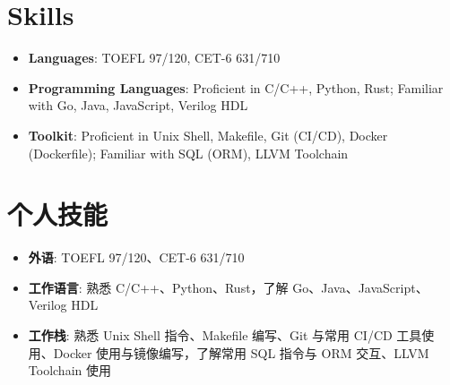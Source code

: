 \ifdefined\english

    \section*{Skills}

    \begin{itemize}
        \item \textbf{Languages}: TOEFL 97/120, CET-6 631/710
        \item \textbf{Programming Languages}: Proficient in C/C++, Python, Rust; Familiar with Go, Java, JavaScript, Verilog HDL
        \item \textbf{Toolkit}: Proficient in Unix Shell, Makefile, Git (CI/CD), Docker (Dockerfile);  Familiar with SQL (ORM), LLVM Toolchain
    \end{itemize}

\else

    \section*{个人技能}

    \begin{itemize}
        \item \textbf{外语}: TOEFL 97/120、CET-6 631/710
        \item \textbf{工作语言}: 熟悉 C/C++、Python、Rust，了解 Go、Java、JavaScript、Verilog HDL
        \item \textbf{工作栈}: 熟悉 Unix Shell 指令、Makefile 编写、Git 与常用 CI/CD 工具使用、Docker 使用与镜像编写，了解常用 SQL 指令与 ORM 交互、LLVM Toolchain 使用
    \end{itemize}

\fi
